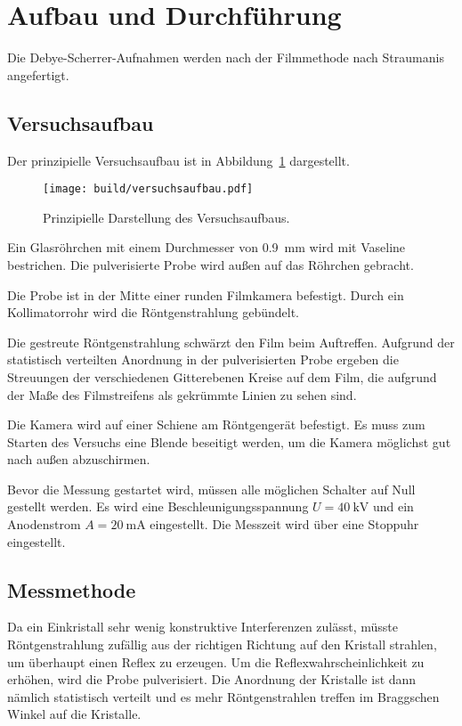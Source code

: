 \section{Aufbau und Durchführung}%
\label{sec:Durchführung}
Die Debye-Scherrer-Aufnahmen werden nach der Filmmethode nach Straumanis angefertigt.

\subsection{Versuchsaufbau}%
\label{sub:versuchsaufbau}
Der prinzipielle Versuchsaufbau ist in Abbildung~\ref{fig:versuchsaufbau} dargestellt.
\begin{figure}
  \centering
  \texttt{[image: build/versuchsaufbau.pdf]}
  \caption{Prinzipielle Darstellung des Versuchsaufbaus.\cite{anleitung}}%
  \label{fig:versuchsaufbau}
\end{figure}

Ein Glasröhrchen mit einem Durchmesser von \SI{0.9}{\milli\meter} wird mit Vaseline bestrichen.
Die pulverisierte Probe wird außen auf das Röhrchen gebracht.

Die Probe ist in der Mitte einer runden Filmkamera befestigt.
Durch ein Kollimatorrohr wird die Röntgenstrahlung gebündelt.

Die gestreute Röntgenstrahlung schwärzt den Film beim Auftreffen.
Aufgrund der statistisch verteilten Anordnung in der pulverisierten Probe
ergeben die Streuungen der verschiedenen Gitterebenen Kreise auf dem Film,
die aufgrund der Maße des Filmstreifens als gekrümmte Linien zu sehen sind.

Die Kamera wird auf einer Schiene am Röntgengerät befestigt.
Es muss zum Starten des Versuchs eine Blende beseitigt werden, um die Kamera
möglichst gut nach außen abzuschirmen.

Bevor die Messung gestartet wird, müssen alle möglichen Schalter auf Null gestellt werden.
Es wird eine Beschleunigungsspannung $U = \SI{40}{\kilo\volt}$ und ein
Anodenstrom $A = \SI{20}{\milli\ampere}$ eingestellt.
Die Messzeit wird über eine Stoppuhr eingestellt.


\subsection{Messmethode}%
\label{sec:Messmethode}
Da ein Einkristall sehr wenig konstruktive Interferenzen zulässt,
müsste Röntgenstrahlung zufällig aus der richtigen Richtung auf den Kristall
strahlen, um überhaupt einen Reflex zu erzeugen.
Um die Reflexwahrscheinlichkeit zu erhöhen, wird die Probe pulverisiert.
Die Anordnung der Kristalle ist dann nämlich statistisch verteilt
und es mehr Röntgenstrahlen treffen im Braggschen Winkel auf die Kristalle.

